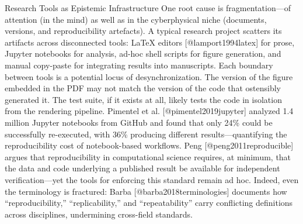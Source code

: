 \documentclass[
  ignorenonframetext,
]{beamer}
\begin{document}
\begin{frame}{Research Tools as Epistemic Infrastructure}
One root cause is fragmentation---of attention (in the mind) as well as
in the cyberphysical niche (documents, versions, and reproducibility
artefacts). A typical research project scatters its artifacts across
disconnected tools: LaTeX editors {[}@lamport1994latex{]} for prose,
Jupyter notebooks for analysis, ad-hoc shell scripts for figure
generation, and manual copy-paste for integrating results into
manuscripts. Each boundary between tools is a potential locus of
desynchronization. The version of the figure embedded in the PDF may not
match the version of the code that ostensibly generated it. The test
suite, if it exists at all, likely tests the code in isolation from the
rendering pipeline. Pimentel et al. {[}@pimentel2019jupyter{]} analyzed
1.4 million Jupyter notebooks from GitHub and found that only 24\% could
be successfully re-executed, with 36\% producing different
results---quantifying the reproducibility cost of notebook-based
workflows. Peng {[}@peng2011reproducible{]} argues that reproducibility
in computational science requires, at minimum, that the data and code
underlying a published result be available for independent
verification---yet the tools for enforcing this standard remain ad hoc.
Indeed, even the terminology is fractured: Barba
{[}@barba2018terminologies{]} documents how ``reproducibility,''
``replicability,'' and ``repeatability'' carry conflicting definitions
across disciplines, undermining cross-field standards.
\end{frame}
\end{document}

